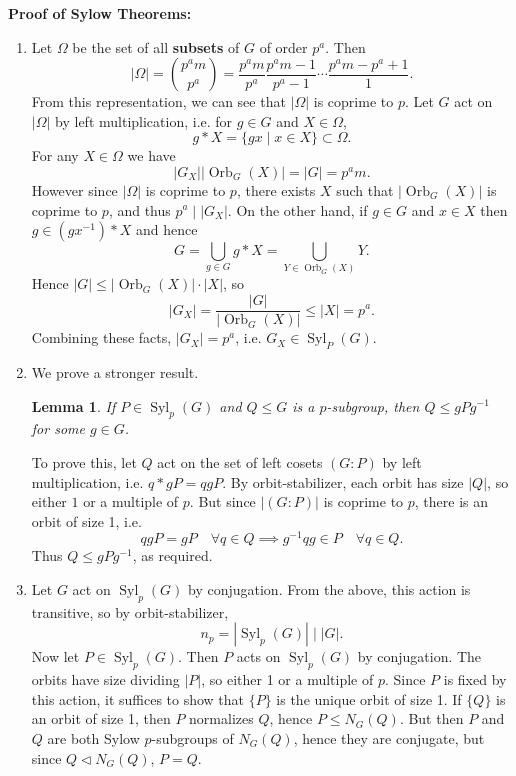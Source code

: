 \documentclass[12pt]{article}
\DeclareMathOperator{\Orb}{Orb}
\DeclareMathOperator{\Syl}{Syl}
\newtheorem{lemma}{Lemma}[section]
\theoremstyle{definition}
\theoremstyle{remark}
\begin{document}
\textbf{Proof of Sylow Theorems:}

\begin{enumerate}[label = (\roman*)]
	\item Let $\Omega$ be the set of all \textbf{subsets} of $G$ of order $p^{a}$. Then
		\[
			|\Omega| = \binom{p^{a}m}{p^{a}} = \frac{p^{a}m}{p^{a}} \frac{p^{a}m - 1}{p^{a} - 1} \cdots \frac{p^{a}m - p^{a} + 1}{1}
		.\]
		From this representation, we can see that $|\Omega|$ is coprime to $p$. Let $G$ act on $|\Omega|$ by left multiplication, i.e. for $g \in G$ and $X \in \Omega$,
		\[
			g \ast X = \{gx \mid x \in X\} \subset \Omega
		.\]
		For any $X \in \Omega$ we have
		\[
			|G_X| |\!\Orb_G(X)| = |G| = p^{a}m
		.\]
		However since $|\Omega|$ is coprime to $p$, there exists $X$ such that $|\!\Orb_G(X)|$ is coprime to $p$, and thus $p^{a} \mid |G_X|$. On the other hand, if $g \in G$ and $x \in X$ then $g \in (gx^{-1}) \ast X$ and hence
		\[
			G = \bigcup_{g \in G} g \ast X = \bigcup_{Y \in \Orb_G(X)} Y
		.\]
		Hence $|G| \leq |\!\Orb_G(X)| \cdot |X|$, so
		\[
			|G_X| = \frac{|G|}{|\!\Orb_G(X)|} \leq |X| = p^{a}
		.\]
		Combining these facts, $|G_X| = p^{a}$, i.e. $G_X \in \Syl_P(G)$.
	\item We prove a stronger result.
		\begin{lemma}
			If $P \in \Syl_p(G)$ and $Q \leq G$ is a $p$-subgroup, then $Q \leq gPg^{-1}$ for some $g \in G$.
		\end{lemma}
		To prove this, let $Q$ act on the set of left cosets $(G:P)$ by left multiplication, i.e. $q \ast gP = qgP$. By orbit-stabilizer, each orbit has size $|Q|$, so either $1$ or a multiple of $p$. But since $|(G:P)|$ is coprime to $p$, there is an orbit of size 1, i.e.
		\[
		qgP = gP \quad \forall q \in Q \implies g^{-1}qg \in P \quad \forall q \in Q
		.\]
		Thus $Q \leq gPg^{-1}$, as required.
	\item Let $G$ act on $\Syl_p(G)$ by conjugation. From the above, this action is transitive, so by orbit-stabilizer,
		\[
			n_p = |\!\Syl_p(G)| \; \big\vert\; |G|
		.\]
		Now let $P \in \Syl_p(G)$. Then $P$ acts on $\Syl_p(G)$ by conjugation. The orbits have size dividing $|P|$, so either 1 or a multiple of $p$. Since $P$ is fixed by this action, it suffices to show that $\{P\}$ is the unique orbit of size 1. If $\{Q\}$ is an orbit of size 1, then $P$ normalizes $Q$, hence $P \leq N_G(Q)$. But then $P$ and $Q$ are both Sylow $p$-subgroups of $N_G(Q)$, hence they are conjugate, but since $Q \lhd N_G(Q)$, $P = Q$.
\end{enumerate}
\end{document}
